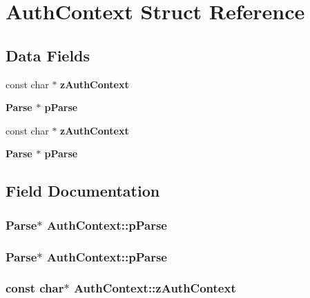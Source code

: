 \section{Auth\-Context Struct Reference}
\label{structAuthContext}
\subsection*{Data Fields}
\begin{CompactItemize}
\item 
const char $\ast$ \bf{z\-Auth\-Context}
\item 
\bf{Parse} $\ast$ \bf{p\-Parse}
\item 
const char $\ast$ \bf{z\-Auth\-Context}
\item 
\bf{Parse} $\ast$ \bf{p\-Parse}
\end{CompactItemize}


\subsection{Field Documentation}
\subsubsection{\setlength{\rightskip}{0pt plus 5cm}\bf{Parse}$\ast$ \bf{Auth\-Context::p\-Parse}}\label{structAuthContext_c9c89880e15cf98e8434573a4fe081c4}


\subsubsection{\setlength{\rightskip}{0pt plus 5cm}\bf{Parse}$\ast$ \bf{Auth\-Context::p\-Parse}}\label{structAuthContext_c9c89880e15cf98e8434573a4fe081c4}


\subsubsection{\setlength{\rightskip}{0pt plus 5cm}const char$\ast$ \bf{Auth\-Context::z\-Auth\-Context}}\label{structAuthContext_f498609343838f7fab86a04a574a3cd8}


